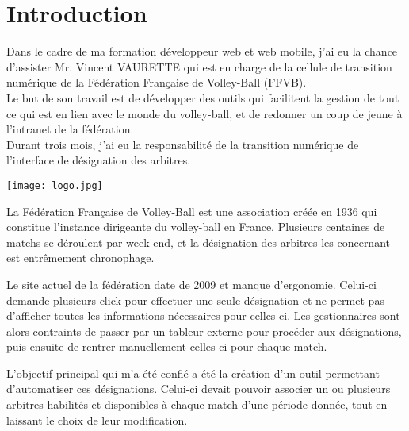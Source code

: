 \section{Introduction}

Dans le cadre de ma formation développeur web et web mobile, j’ai eu la chance d’assister Mr. Vincent VAURETTE qui est en charge de la cellule de transition numérique de la Fédération Française de Volley-Ball (FFVB).\\
Le but de son travail est de développer des outils qui facilitent la gestion de tout ce qui est en lien avec le monde du volley-ball, et de redonner un coup de jeune à l’intranet de la fédération.\\
Durant trois mois, j’ai eu la responsabilité de la transition numérique de l’interface de désignation des arbitres.

\vspace{1cm}

\texttt{[image: logo.jpg]}

La Fédération Française de Volley-Ball est une association créée en 1936 qui constitue l’instance dirigeante du volley-ball en France. 
Plusieurs centaines de matchs se déroulent par week-end, et la désignation des arbitres les concernant est entrêmement chronophage.


\begin{commentaire}
    Le site actuel de la fédération date de 2009 et manque d’ergonomie. Celui-ci demande plusieurs click pour effectuer une seule désignation et ne permet pas d’afficher toutes les informations nécessaires pour celles-ci. Les gestionnaires sont alors contraints de passer par un tableur externe pour procéder aux désignations, puis ensuite de rentrer manuellement celles-ci pour chaque match.
\end{commentaire}


L’objectif principal qui m’a été confié a été la création d’un outil permettant d’automatiser ces désignations. Celui-ci devait pouvoir associer un ou plusieurs arbitres habilités et disponibles à chaque match d’une période donnée, tout en laissant le choix de leur modification.